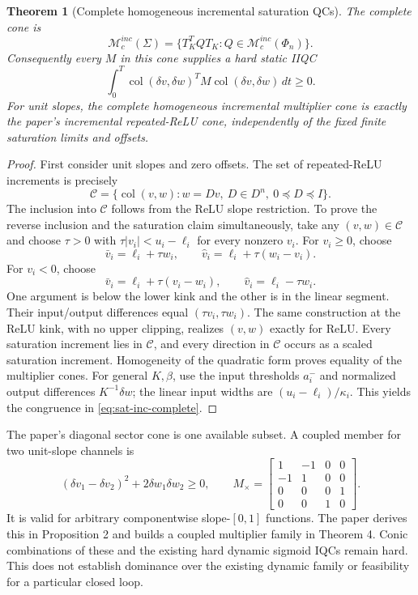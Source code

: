 \documentclass[10pt,a4paper]{article}
\newtheorem{theorem}{Theorem}
\theoremstyle{definition}
\theoremstyle{remark}
\newcommand{\col}{\operatorname{col}}
\newcommand{\mc}{\mathcal M_c}
\begin{document}
\begin{theorem}[Complete homogeneous incremental saturation QCs]\label{thm:satinc}
The complete cone is
\begin{equation}\label{eq:sat-inc-complete}
 \boxed{\mc^{inc}(\Sigma)=
 \{T_K^TQT_K:Q\in\mc^{inc}(\Phi_n)\}.}
\end{equation}
Consequently every $M$ in this cone supplies a hard static IIQC
\[
 \int_0^T\col(\delta v,\delta w)^TM\col(\delta v,\delta w)\,dt\ge0.
\]
For unit slopes, the complete homogeneous incremental multiplier cone is exactly the paper's incremental repeated-ReLU cone, independently of the fixed finite saturation limits and offsets.
\end{theorem}
\begin{proof}
First consider unit slopes and zero offsets. The set of repeated-ReLU increments is precisely
\[
 \mathcal C=\{\col(v,w):w=Dv,\ D\in D^n,\ 0\preceq D\preceq I\}.
\]
The inclusion into $\mathcal C$ follows from the ReLU slope restriction. To prove the reverse inclusion and the saturation claim simultaneously, take any $(v,w)\in\mathcal C$ and choose $\tau>0$ with $\tau|v_i|<u_i-\ell_i$ for every nonzero $v_i$. For $v_i\ge0$, choose
\[
 \bar v_i=\ell_i+\tau w_i,\qquad
 \hat v_i=\ell_i+\tau(w_i-v_i).
\]
For $v_i<0$, choose
\[
 \bar v_i=\ell_i+\tau(v_i-w_i),\qquad
 \hat v_i=\ell_i-\tau w_i.
\]
One argument is below the lower kink and the other is in the linear segment. Their input/output differences equal $(\tau v_i,\tau w_i)$. The same construction at the ReLU kink, with no upper clipping, realizes $(v,w)$ exactly for ReLU. Every saturation increment lies in $\mathcal C$, and every direction in $\mathcal C$ occurs as a scaled saturation increment. Homogeneity of the quadratic form proves equality of the multiplier cones. For general $K,\beta$, use the input thresholds $a_i^-$ and normalized output differences $K^{-1}\delta w$; the linear input widths are $(u_i-\ell_i)/\kappa_i$. This yields the congruence in \eqref{eq:sat-inc-complete}.
\end{proof}

The paper's diagonal sector cone is one available subset. A coupled member for two unit-slope channels is
\begin{equation}\label{eq:cross}
 (\delta v_1-\delta v_2)^2+2\delta w_1\delta w_2\ge0,
 \qquad
 M_\times=\begin{bmatrix}1&-1&0&0\\-1&1&0&0\\0&0&0&1\\0&0&1&0\end{bmatrix}.
\end{equation}
It is valid for arbitrary componentwise slope-$[0,1]$ functions. The paper derives this in Proposition 2 and builds a coupled multiplier family in Theorem 4. Conic combinations of these and the existing hard dynamic sigmoid IQCs remain hard. This does not establish dominance over the existing dynamic family or feasibility for a particular closed loop.
\end{document}
